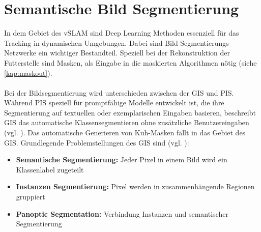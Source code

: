 \documentclass[12pt,DIV=15,BCOR=15mm,twoside,headsepline,abstract=true,listof=totoc,bibliography=totoc]{scrreprt}
\theoremstyle{remark}    %
\begin{document}
    \chapter{Semantische Bild Segmentierung}\label{sec:SemSeg}
    In dem Gebiet des \ac{vSLAM} sind Deep Learning Methoden essenziell für das Tracking in dynamischen Umgebungen. Dabei sind Bild-Segmentierungs Netzwerke ein 
    wichtiger Bestandteil. Speziell bei der Rekonstruktion der Futterstelle sind Masken, als Eingabe in die maskierten Algorithmen nötig (siehe \ref{kap:maskout}).\\\\
    Bei der Bildsegmentierung wird unterschieden zwischen der \ac{GIS} und \ac{PIS}. Während \ac{PIS} speziell für promptfähige Modelle entwickelt ist, die 
    ihre Segmentierung auf textuellen oder exemplarischen Eingaben basieren, beschreibt \ac{GIS} das automatische Klassensegmentieren ohne zusätzliche 
    Benutzereingaben (vgl. \cite{zhou2024imagesegmentationfoundationmodel}). Das automatische Generieren von Kuh-Masken fällt in das Gebiet des \ac{GIS}.
    Grundlegende  Problemstellungen des \ac{GIS} sind (vgl. \cite{zhou2024imagesegmentationfoundationmodel, csurka2023semanticimagesegmentationdecades}):
    \begin{itemize}
        \item \textbf{Semantische Segmentierung:} Jeder Pixel in einem Bild wird ein Klassenlabel zugeteilt
        \item \textbf{Instanzen Segmentierung:} Pixel werden in zusammenhängende Regionen gruppiert
        \item \textbf{Panoptic Segmentation:} Verbindung Instanzen und semantischer Segmentierung
    \end{itemize}
   
\end{document}
